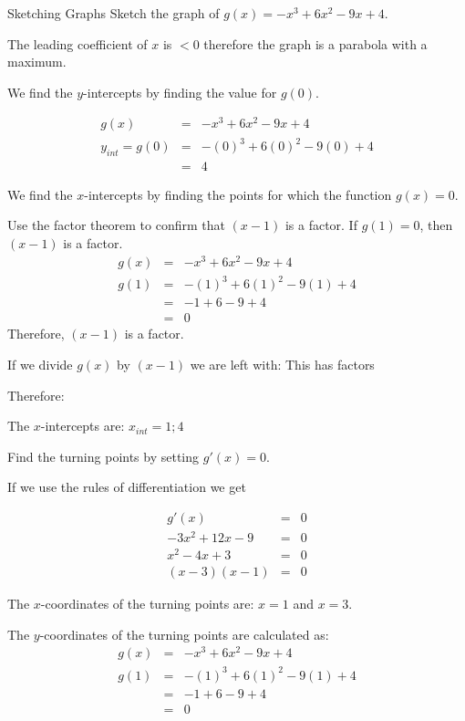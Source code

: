 \begin{wex}
{Sketching Graphs}
{Sketch the graph of $g(x)=-x^3 +6x^2 -9x +4$.}
{
The leading coefficient of $x$ is $<0$ therefore the graph is a parabola with a maximum.

We find the $y$-intercepts by finding the value for $g(0)$.

\begin{eqnarray*}
g(x)&=&-x^3 +6x^2 -9x +4\\
y_{int}=g(0)&=&-(0)^3 +6(0)^2 -9(0) +4\\
&=&4
\end{eqnarray*}

We find the $x$-intercepts by finding the points for which the function $g(x)=0$.


Use the factor theorem to confirm that $(x-1)$ is a factor. If $g(1)=0$, then $(x-1)$ is a factor.
\begin{eqnarray*}
g(x)&=&-x^3 +6x^2 -9x +4\\
g(1)&=&-(1)^3 +6(1)^2 -9(1) +4\\
&=&-1+6-9+4\\
&=&0
\end{eqnarray*}
Therefore, $(x-1)$ is a factor.

If we divide $g(x)$ by $(x-1)$ we are left with:
This has factors

Therefore:

The $x$-intercepts are: $x_{int}=1; 4$

Find the turning points by setting $g'(x)=0$.

If we use the rules of differentiation we get

\begin{eqnarray*}
g'(x)&=&0\\
-3x^2+12x-9&=&0\\
x^2-4x+3&=&0\\
(x-3)(x-1)&=&0
\end{eqnarray*}

The $x$-coordinates of the turning points are: $x=1$ and $x=3$.

The $y$-coordinates of the turning points are calculated as:
\begin{eqnarray*}
g(x)&=&-x^3 +6x^2 -9x +4\\
g(1)&=&-(1)^3 +6(1)^2 -9(1) +4\\
&=&-1+6-9+4\\
&=&0
\end{eqnarray*}

}
\end{wex}
